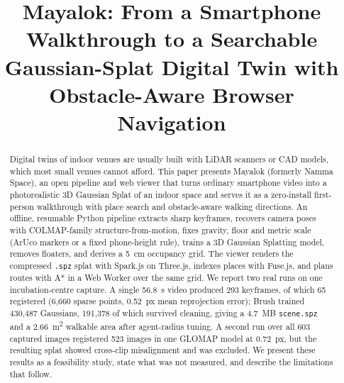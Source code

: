 \documentclass[conference]{IEEEtran}
\begin{document}
\title{Mayalok: From a Smartphone Walkthrough to a Searchable Gaussian-Splat Digital Twin with Obstacle-Aware Browser Navigation}

\author{
}

\maketitle

\begin{abstract}
Digital twins of indoor venues are usually built with LiDAR scanners or CAD models, which most small venues cannot afford. This paper presents Mayalok (formerly Namma Space), an open pipeline and web viewer that turns ordinary smartphone video into a photorealistic 3D Gaussian Splat of an indoor space and serves it as a zero-install first-person walkthrough with place search and obstacle-aware walking directions. An offline, resumable Python pipeline extracts sharp keyframes, recovers camera poses with COLMAP-family structure-from-motion, fixes gravity, floor and metric scale (ArUco markers or a fixed phone-height rule), trains a 3D Gaussian Splatting model, removes floaters, and derives a 5~cm occupancy grid. The viewer renders the compressed \texttt{.spz} splat with Spark.js on Three.js, indexes places with Fuse.js, and plans routes with A* in a Web Worker over the same grid. We report two real runs on one incubation-centre capture. A single 56.8~s video produced 293 keyframes, of which 65 registered (6,660 sparse points, 0.52~px mean reprojection error); Brush trained 430,487 Gaussians, 191,378 of which survived cleaning, giving a 4.7~MB \texttt{scene.spz} and a 2.66~m\textsuperscript{2} walkable area after agent-radius tuning. A second run over all 603 captured images registered 523 images in one GLOMAP model at 0.72~px, but the resulting splat showed cross-clip misalignment and was excluded. We present these results as a feasibility study, state what was not measured, and describe the limitations that follow.
\end{abstract}
\end{document}
